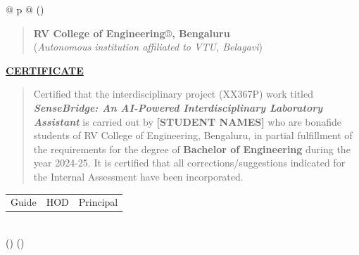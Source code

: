 \documentclass[12pt]{article}
\begin{document}
\begin{longtable}[]{@{} p{\textwidth} @{}}
\toprule()
\begin{minipage}[b]{\linewidth}\raggedright
\begin{quote}
\textbf{RV College of Engineering}®\textbf{, Bengaluru} \\
(\emph{Autonomous institution affiliated to VTU, Belagavi})
\end{quote}

\centering
\textbf{\uline{CERTIFICATE}} \\
\vspace{1cm}
\begin{quote}
Certified that the interdisciplinary project (XX367P) work titled \\
\emph{\textbf{SenseBridge: An AI-Powered Interdisciplinary Laboratory Assistant}} is carried out by \textbf{[STUDENT NAMES]} who are bonafide students of RV College of Engineering, Bengaluru, in partial fulfillment of the requirements for the degree of \textbf{Bachelor of Engineering} during the year 2024-25. It is certified that all corrections/suggestions indicated for the Internal Assessment have been incorporated.
\end{quote}

\vspace{3cm}
\begin{tabular}{p{5cm} p{5cm} p{5cm}}
    Guide & HOD & Principal
\end{tabular}
\end{minipage} \\
\midrule()
\endhead
\bottomrule()
\end{longtable}

\newpage
\end{document}
